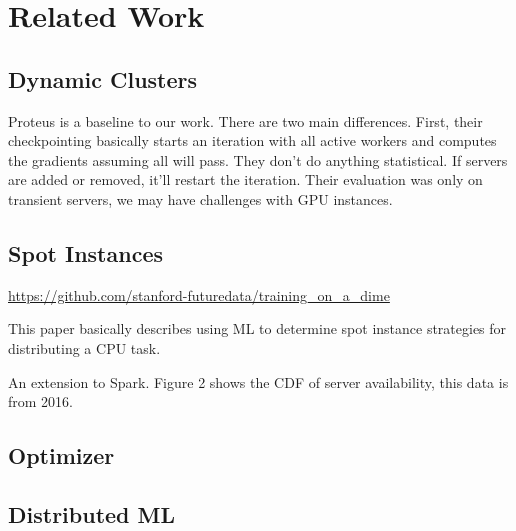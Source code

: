 \chapter{Related Work}
\label{ch:related work}

\section{Dynamic Clusters}


Proteus is a baseline to our work.
There are two main differences.
First, their checkpointing basically starts an iteration with all active workers
and computes the gradients assuming all will pass.
They don't do anything statistical.
If servers are added or removed, it'll restart the iteration.
Their evaluation was only on transient servers, we may have challenges with GPU
instances.

\section{Spot Instances}


\url{https://github.com/stanford-futuredata/training_on_a_dime}



This paper basically describes using ML to determine spot instance strategies
for distributing a CPU task.


An extension to Spark.
Figure 2 shows the CDF of server availability, this data is from 2016.

\section{Optimizer}


\section{Distributed ML}


